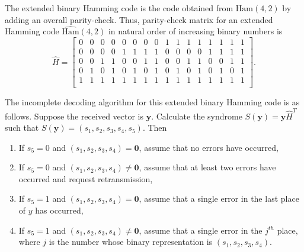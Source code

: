 The extended binary Hamming code is the code obtained from $\textrm{Ham}(4,2)$ by adding an overall parity-check. Thus, parity-check matrix for an extended Hamming code $\hat{\textrm{Ham}}(4,2)$ in natural order of increasing binary numbers is 
\begin{equation*}
\hat{H} = 
\begin{bmatrix}
0 & 0 & 0 & 0 & 0 & 0 & 0 & 0 & 1 & 1 & 1 & 1 & 1 & 1 & 1 & 1\\ 
0 & 0 & 0 & 0 & 1 & 1 & 1 & 1 & 0 & 0 & 0 & 0 & 1 & 1 & 1 & 1\\ 
0 & 0 & 1 & 1 & 0 & 0 & 1 & 1 & 0 & 0 & 1 & 1 & 0 & 0 & 1 & 1\\ 
0 & 1 & 0 & 1 & 0 & 1 & 0 & 1 & 0 & 1 & 0 & 1 & 0 & 1 & 0 & 1\\
1 & 1 & 1 & 1 & 1 & 1 & 1 & 1 & 1 & 1 & 1 & 1 & 1 & 1 & 1 & 1\\
\end{bmatrix}.
\end{equation*}

The incomplete decoding algorithm for this extended binary Hamming code is as follows. Suppose the received vector is $\bm{y}$.  Calculate the syndrome $S(\bm{y}) = \bm{y}\hat{H}^T$ such that $S(\bm{y}) = (s_1, s_2, s_3, s_4, s_5)$. Then
\begin{enumerate}
\item
	If $s_5 = 0$ and $(s_1, s_2, s_3, s_4) = \bm{0}$, assume that no errors have occurred,
\item
	If $s_5 = 0$ and $(s_1, s_2, s_3, s_4) \not= \bm{0}$, assume that at least two errors have occurred and request retransmission,
\item
	If $s_5 = 1$ and $(s_1, s_2, s_3, s_4) = \bm{0}$, assume that a single error in the last place of $y$ has occurred,
\item
	If $s_5 = 1$ and $(s_1, s_2, s_3, s_4) \not= \bm{0}$, assume that a single error in the $j^{th}$ place, where $j$ is the number whose binary representation is $(s_1, s_2, s_3, s_4)$.
\end{enumerate}

